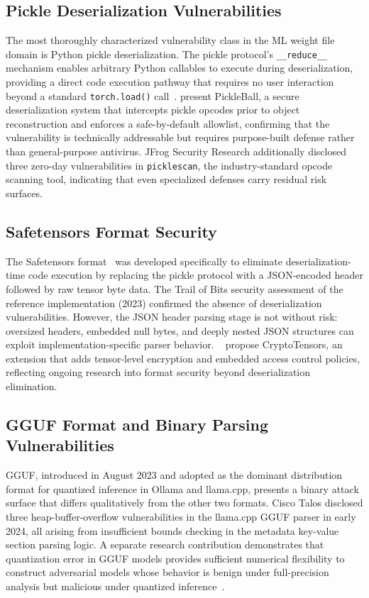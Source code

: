 \documentclass[preprint,12pt,twocolumn]{elsarticle}
\begin{document}
\subsection{Pickle Deserialization Vulnerabilities}

The most thoroughly characterized vulnerability class in the ML weight file
domain is Python pickle deserialization. The pickle protocol's
\texttt{\_\_reduce\_\_} mechanism enables arbitrary Python callables to
execute during deserialization, providing a direct code execution pathway
that requires no user interaction beyond a standard \texttt{torch.load()}
call~\citep{pickleball2025}. \citeauthor{pickleball2025} present PickleBall,
a secure deserialization system that intercepts pickle opcodes prior to
object reconstruction and enforces a safe-by-default allowlist, confirming
that the vulnerability is technically addressable but requires purpose-built
defense rather than general-purpose antivirus. JFrog Security Research
additionally disclosed three zero-day vulnerabilities in
\texttt{picklescan}, the industry-standard opcode scanning tool, indicating
that even specialized defenses carry residual risk surfaces.

\subsection{Safetensors Format Security}

The Safetensors format~\citep{safetensors2025empirical} was developed
specifically to eliminate deserialization-time code execution by replacing
the pickle protocol with a JSON-encoded header followed by raw tensor byte
data. The Trail of Bits security assessment of the reference implementation
(2023) confirmed the absence of deserialization vulnerabilities. However,
the JSON header parsing stage is not without risk: oversized headers,
embedded null bytes, and deeply nested JSON structures can exploit
implementation-specific parser behavior. \citeauthor{cryptotensors2024}~\citep{cryptotensors2024}
propose CryptoTensors, an extension that adds tensor-level encryption and
embedded access control policies, reflecting ongoing research into format
security beyond deserialization elimination.

\subsection{GGUF Format and Binary Parsing Vulnerabilities}

GGUF, introduced in August 2023 and adopted as the dominant distribution
format for quantized inference in Ollama and llama.cpp, presents a binary
attack surface that differs qualitatively from the other two formats. Cisco
Talos disclosed three heap-buffer-overflow vulnerabilities in the llama.cpp
GGUF parser in early 2024, all arising from insufficient bounds checking in
the metadata key-value section parsing logic. A separate research contribution
demonstrates that quantization error in GGUF models provides sufficient
numerical flexibility to construct adversarial models whose behavior is
benign under full-precision analysis but malicious under quantized
inference~\citep{gguf_quantization_attack2024}.
\end{document}
